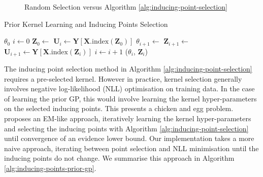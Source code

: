 \documentclass{article}
\numberwithin{equation}{section}
\begin{document}
\begin{figure}[h!]
\begin{minipage}{.25\textwidth}
\end{minipage}%
\caption{Random Selection versus Algorithm \ref{alg:inducing-point-selection}}\label{fig:inducing-point-algo}
\end{figure}

\begin{algorithm}[h!]
\caption{Prior Kernel Learning and Inducing Points Selection}\label{alg:inducing-points-prior-gp}
\begin{algorithmic}
\Require $\theta_0$ 
 \State $i \leftarrow 0$
  \State $\mathbf{Z}_0 \leftarrow$  
  \State $\mathbf{U}_i \leftarrow \mathbf{Y}\left[\mathbf{X}.\text{index}\left(\mathbf{Z}_0\right)\right]$ 
\State $\theta_{i+1} \leftarrow$  
\State $\mathbf{Z}_{i+1} \leftarrow$ 
\State $\mathbf{U}_{i+1} \leftarrow \mathbf{Y}\left[\mathbf{X}.\text{index}\left(\mathbf{Z}_i\right)\right]$
\State $i \leftarrow i+1$
\EndWhile
\State \Return ($\theta_i$, $\mathbf{Z}_i$)
\end{algorithmic}
\end{algorithm}


The inducing point selection method in Algorithm \ref{alg:inducing-point-selection} requires a pre-selected kernel.
However in practice, kernel selection generally involves negative log-likelihood (NLL) optimisation on training data.
In the case of learning the prior GP, this would involve learning the kernel hyper-parameters on the selected inducing points.
This presents a chicken and egg problem.
\cite{burt2020convergence} proposes an EM-like approach, iteratively learning the kernel hyper-parameters and selecting the inducing points with Algorithm \ref{alg:inducing-point-selection} until convergence of an evidence lower bound.
Our implementation takes a more naive approach, iterating between point selection and NLL minimisation until the inducing points do not change. 
We summarise this approach in Algorithm \ref{alg:inducing-points-prior-gp}.
\end{document}
